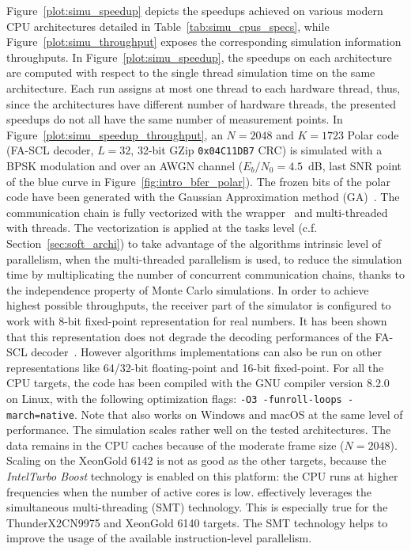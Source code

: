 Figure~\ref{plot:simu_speedup} depicts the speedups achieved on various modern
CPU architectures detailed in Table~\ref{tab:simu_cpus_specs}, while
Figure~\ref{plot:simu_throughput} exposes the corresponding simulation
information throughputs. In Figure~\ref{plot:simu_speedup}, the speedups on each
architecture are computed with respect to the single thread simulation time on
the same architecture. Each run assigns at most one \AFFECT thread to each
hardware thread, thus, since the architectures have different number of hardware
threads, the presented speedups do not all have the same number of measurement
points. In Figure~\ref{plot:simu_speedup_throughput}, an $N=2048$ and $K=1723$
Polar code (FA-SCL decoder, $L=32$, 32-bit GZip \verb|0x04C11DB7| CRC) is
simulated with a BPSK modulation and over an AWGN channel ($E_b/N_0 = 4.5$~dB,
last SNR point of the blue curve in Figure~\ref{fig:intro_bfer_polar}). The
frozen bits of the polar code have been generated with the Gaussian
Approximation method (GA)~\cite{Trifonov2012}. The communication chain is fully
vectorized with the \MIPP wrapper~\cite{Cassagne2018} and multi-threaded with
 threads. The vectorization is applied at the tasks level (c.f.
Section~\ref{sec:soft_archi}) to take advantage of the algorithms intrinsic
level of parallelism, when the multi-threaded parallelism is used, to reduce the
simulation time by multiplicating the number of concurrent communication chains,
thanks to the independence property of Monte Carlo simulations. In order to
achieve highest possible throughputs, the receiver part of the simulator is
configured to work with 8-bit fixed-point representation for real numbers. It
has been shown that this representation does not degrade the decoding
performances of the FA-SCL decoder~\cite{Leonardon2019}. However \AFFECT
algorithms implementations can also be run on other representations like
64/32-bit floating-point and 16-bit fixed-point. For all the CPU targets, the
code has been compiled with the \Cxx GNU compiler version 8.2.0 on Linux, with
the following optimization flags: \verb|-O3 -funroll-loops -march=native|. Note
that \AFFECT also works on Windows and macOS at the same level of performance.
The simulation scales rather well on the tested architectures. The data remains
in the CPU caches because of the moderate frame size ($N = 2048$). Scaling on
the Xeon\TM Gold 6142 is not as good as the other targets, because the
\textit{Intel\R Turbo Boost} technology is enabled on this platform: the CPU
runs at higher frequencies when the number of active cores is low. \AFFECT
effectively leverages the simultaneous multi-threading (SMT) technology. This is
especially true for the ThunderX2\R CN9975 and Xeon\TM Gold 6140 targets. The
SMT technology helps to improve the usage of the available instruction-level
parallelism.

